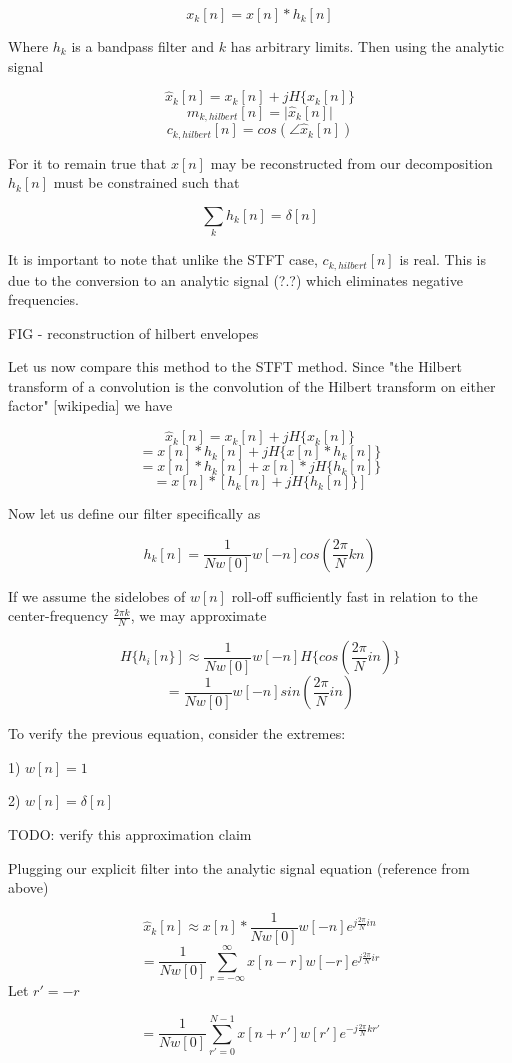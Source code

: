 \documentclass [11pt, proquest] {uwthesis}[2015/03/03]
\begin{document}
$$x_k[n] = x[n] * h_k[n]$$

Where $h_k$ is a bandpass filter and $k$ has arbitrary limits.  Then using the analytic signal

$$\widehat{x}_k[n] = x_k[n] + jH\{x_k[n]\}$$
$$m_{k,hilbert}[n] = \vert\widehat{x}_k[n]\vert$$
$$c_{k,hilbert}[n] = cos(\angle\widehat{x}_k[n])$$

For it to remain true that $x[n]$ may be reconstructed from our decomposition $h_k[n]$ must be constrained such that 

$$\sum_k h_k[n] = \delta[n]$$

It is important to note that unlike the STFT case, $c_{k,hilbert}[n]$ is real.  This is due to the conversion to an analytic signal (?.?) which eliminates negative frequencies.

FIG - reconstruction of hilbert envelopes

Let us now compare this method to the STFT method.  Since "the Hilbert transform of a convolution is the convolution of the Hilbert transform on either factor" [wikipedia] we have 

$$\widehat{x}_k[n] = x_k[n] + jH\{x_k[n]\}$$
$$= x[n] * h_k[n] + jH\{x[n] * h_k[n]\}$$
$$= x[n] * h_k[n] + x[n] * jH\{h_k[n]\}$$
$$= x[n] * [h_k[n]+  jH\{h_k[n]\}]$$

Now let us define our filter specifically as

$$h_k[n] = \frac{1}{Nw[0]}w[-n]cos(\frac{2\pi}{N}kn)$$

If we assume the sidelobes of $w[n]$ roll-off sufficiently fast in relation to the center-frequency $\frac{2\pi k}{N}$, we may approximate

$$H\{h_i[n\}] \approx \frac{1}{Nw[0]}w[-n] H\{cos(\frac{2\pi}{N}in)\}$$
$$= \frac{1}{Nw[0]}w[-n]sin(\frac{2\pi}{N}in)$$

To verify the previous equation, consider the extremes:

1) $w[n] = 1$

2) $w[n] = \delta[n]$

TODO: verify this approximation claim

Plugging our explicit filter into the analytic signal equation (reference from above)

$$\widehat{x}_k[n] \approx x[n] * \frac{1}{Nw[0]}w[-n]e^{j\frac{2\pi}{N}in}$$
$$ =\frac{1}{Nw[0]}\sum\limits_{r=-\infty}^{\infty}x[n - r] w[-r] e^{j\frac{2\pi}{N}ir}$$
Let $r' = -r$

$$= \frac{1}{Nw[0]}\sum\limits_{r'=0}^{N-1} x[n + r'] w[r'] e^{-j\frac{2\pi}{N}kr'}$$
\end{document}
